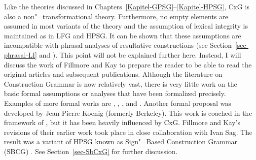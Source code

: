 \addlines
Like the theories discussed in Chapters~\ref{Kapitel-GPSG}--\ref{Kapitel-HPSG}, CxG is also a non"=transformational theory.
Furthermore, no empty elements are assumed in most variants of the theory and the assumption of lexical integrity is maintained
 as in LFG and HPSG. 
It can be shown that these assumptions are incompatible with phrasal analyses of resultative constructions (see
Section~\ref{sec-phrasal-LI} and \citealp{Mueller2006d,Mueller2007d}). This point will not be explained further here. Instead, I will discuss the work of Fillmore and Kay to prepare the reader
to be able to read the original articles and subsequent publications. Although the literature on Construction Grammar is now relatively vast, there is very
little work on the basic formal assumptions or analyses that have been formalized precisely.
Examples of more formal works are , \citet{Kay2002a}, , and
. Another formal proposal was developed by Jean-Pierre Koenig
\citeyearpar{Koenig99a} (formerly Berkeley). This work is coached in the framework of \hpsg, but it has been heavily influenced by CxG. Fillmore and Kay's revisions of their earlier work
took place in close collaboration with Ivan Sag. The result was a variant of HPSG known as Sign"=Based Construction Grammar (SBCG) \citep{Sag2010b,Sag2012a}.
See Section~\ref{sec-SbCxG} for further discussion.

